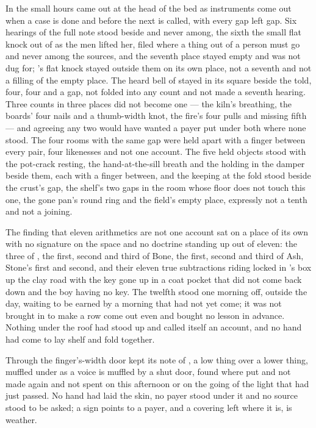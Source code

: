 \scenebreak

In the small hours  came out at the head of the bed as instruments come out when a case is done and before the next is called, with every gap left gap. Six hearings of the full note stood beside and never among, the sixth the small flat knock out of  as the men lifted her, filed where a thing out of a person must go and never among the sources, and the seventh place stayed empty and was not dug for; 's flat knock stayed outside them on its own place, not a seventh and not a filling of the empty place. The heard bell of  stayed in its square beside the told, four, four and a gap, not folded into any count and not made a seventh hearing. Three counts in three places did not become one --- the kiln's breathing, the boards' four nails and a thumb-width knot, the fire's four pulls and missing fifth --- and agreeing any two would have wanted a payer put under both where none stood. The four rooms with the same gap were held apart with a finger between every pair, four likenesses and not one account. The five held objects stood with the pot-crack resting, the hand-at-the-sill breath and the holding in the damper beside them, each with a finger between, and the keeping at the fold stood beside the crust's gap, the shelf's two gaps in the room whose floor does not touch this one, the gone pan's round ring and the field's empty place, expressly not a tenth and not a joining.

The finding that eleven arithmetics are not one account sat on a place of its own with no signature on the space and no doctrine standing up out of eleven: the three of , the first, second and third of Bone, the first, second and third of Ash, Stone's first and second, and their eleven true subtractions riding locked in 's box up the clay road with the key gone up in a coat pocket that did not come back down and the boy having no key. The twelfth stood one morning off, outside the day, waiting to be earned by a morning that had not yet come; it was not brought in to make a row come out even and bought no lesson in advance. Nothing under the roof had stood up and called itself an account, and no hand had come to lay shelf and fold together.

Through the finger's-width door  kept its note of , a low thing over a lower thing, muffled under  as a voice is muffled by a shut door, found where put and not made again and not spent on this afternoon or on the going of the light that had just passed. No hand had laid the skin, no payer stood under it and no source stood to be asked; a sign points to a payer, and a covering left where it is, is weather.

